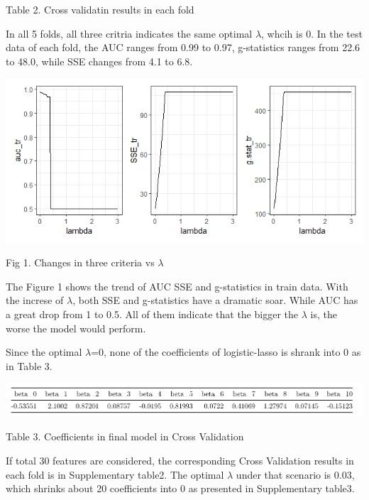 \documentclass[]{article}
\begin{document}
\begin{center}
Table 2. Cross validatin results in each fold
\end{center}

In all 5 folds, all three critria indicates the same optimal
\(\lambda\), whcih is 0. In the test data of each fold, the AUC ranges
from 0.99 to 0.97, g-statistics ranges from 22.6 to 48.0, while SSE
changes from 4.1 to 6.8.

\begin{center}
\includegraphics{./results/lambda_change.jpeg}
\end{center}

\begin{center}
Fig 1. Changes in three criteria vs $\lambda$
\end{center}

The Figure 1 shows the trend of AUC SSE and g-statistics in train data.
With the increse of \(\lambda\), both SSE and g-statistics have a
dramatic soar. While AUC has a great drop from 1 to 0.5. All of them
indicate that the bigger the \(\lambda\) is, the worse the model would
perform.

Since the optimal \(\lambda\)=0, none of the coefficients of
logistic-lasso is shrank into 0 as in Table 3.

\begin{center}
\includegraphics{./results/10 coed when lambd=0.png}
\end{center}

\begin{center}
Table 3. Coefficients in final model in Cross Validation
\end{center}

If total 30 features are considered, the corresponding Cross Validation
results in each fold is in Supplementary table2. The optimal \(\lambda\)
under that scenario is 0.03, which shrinks about 20 coefficients into 0
as presented in Supplementary table3.
\end{document}
